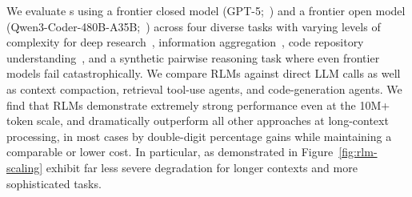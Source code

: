 We evaluate \RLM{}s using a frontier closed model (GPT-5;~\citealt{openai2025gpt5systemcard}) and a frontier open model (Qwen3-Coder-480B-A35B;~\citealt{Qwen3-Coder-480B-A35B}) across four diverse tasks with varying levels of complexity for deep research~\citep{chen2025browsecompplusfairtransparentevaluation}, information aggregation~\citep{bertsch2025oolongevaluatinglongcontext}, code repository understanding~\citep{bai2025longbenchv2deeperunderstanding}, and a synthetic pairwise reasoning task where even frontier models fail catastrophically. We compare RLMs against direct LLM calls as well as context compaction, retrieval tool-use agents, and code-generation agents.
We find that RLMs demonstrate extremely strong performance even at the 10M+ token scale, and dramatically outperform all other approaches at long-context processing, in most cases by double-digit percentage gains while maintaining a comparable or lower cost. In particular, as demonstrated in Figure~\ref{fig:rlm-scaling} exhibit far less severe degradation for longer contexts and more sophisticated tasks.




